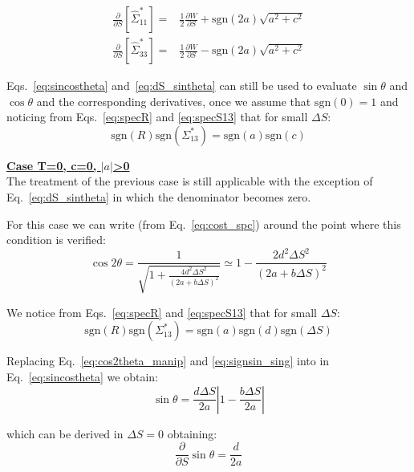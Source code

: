 \begin{align}
\frac{\partial }{\partial S} \left[\hat{\Sigma}^*_{11} \right] =& \frac{1}{2}\frac{\partial W }{\partial S}
+ \mathrm{sgn}(2a)\sqrt{a^2 + c^2 }
\\
\frac{\partial }{\partial S} \left[\hat{\Sigma}^*_{33} \right] =&\frac{1}{2}\frac{\partial W }{\partial S}
- \mathrm{sgn}(2a)\sqrt{a^2 + c^2 }
\end{align}

Eqs.~\ref{eq:sincostheta} and~\ref{eq:dS_sintheta} can still be used to evaluate $\sin \theta$ and $\cos \theta$ and the corresponding derivatives, once we assume that $\mathrm{sgn}(0) = 1$ and noticing from Eqs.~\ref{eq:specR} and \ref{eq:specS13} that for small $\Delta S$:
\begin{equation}
\mathrm{sgn}(R)\mathrm{sgn}(\Sigma^*_{13}) = \mathrm{sgn}(a)\mathrm{sgn}(c)
\end{equation}


\textbf{\underline{Case T=0, c=0, $\left| a \right|$>0}}
~\\

The treatment of the previous case is still applicable with the exception of Eq.~\ref{eq:dS_sintheta} in which the denominator becomes zero.

For this case we can write (from Eq.~\ref{eq:cost_spc}) around the point where this condition is verified:
\begin{equation}
\cos 2\theta =  \frac{1}{\sqrt{1+\frac{4d^2 \Delta S^2}{\left(2a +b \Delta S\right)^2}}} \simeq  
1-\frac{2d^2 \Delta S^2}{\left(2a +b \Delta S\right)^2}
\label{eq:cos2theta_manip}
\end{equation}

We notice from Eqs.~\ref{eq:specR} and \ref{eq:specS13} that for small $\Delta S$:
\begin{equation}
\mathrm{sgn}(R)\mathrm{sgn}(\Sigma^*_{13}) = \mathrm{sgn}(a)\mathrm{sgn}(d)\mathrm{sgn}(\Delta S)\label{eq:signsin_sing}
\end{equation}

Replacing Eq.~\ref{eq:cos2theta_manip} and \ref{eq:signsin_sing} into in Eq.~\ref{eq:sincostheta}
we obtain:
\begin{equation}
\sin\theta =  \frac{d\Delta S}{2a} \left| 1 - \frac{b \Delta S}{2a}\right|
\end{equation}

which can be derived in $\Delta S = 0$ obtaining:
\begin{equation}
\frac{\partial }{\partial S} \sin \theta =\frac{d}{2a} 
\end{equation}


